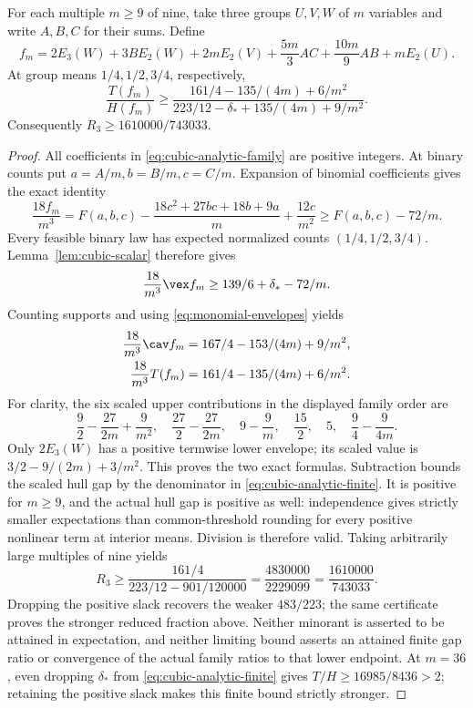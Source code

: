 \begin{theorem}\label{thm:cubic-analytic}
For each multiple $m\ge9$ of nine, take three groups $U,V,W$ of $m$
variables and write $A,B,C$ for their sums. Define
\begin{equation}\label{eq:cubic-analytic-family}
 f_m=2E_3(W)+3B E_2(W)+2mE_2(V)
       +\frac{5m}{3}AC+\frac{10m}{9}AB+mE_2(U).
\end{equation}
At group means $1/4,1/2,3/4$, respectively,
\begin{equation}\label{eq:cubic-analytic-finite}
 \frac{T(f_m)}{H(f_m)}\ge
 \frac{161/4-135/(4m)+6/m^2}
 {223/12-\delta_*+135/(4m)+9/m^2}.
\end{equation}
Consequently $R_3\ge1610000/743033$.
\end{theorem}
\begin{proof}
All coefficients in \eqref{eq:cubic-analytic-family} are positive integers.
At binary counts put $a=A/m,b=B/m,c=C/m$. Expansion of binomial
coefficients gives the exact identity
\begin{equation}\label{eq:cubic-count-expansion}
 \frac{18f_m}{m^3}=F(a,b,c)
 -\frac{18c^2+27bc+18b+9a}{m}+\frac{12c}{m^2}
 \ge F(a,b,c)-72/m.
\end{equation}
Every feasible binary law has expected normalized counts
$(1/4,1/2,3/4)$. Lemma~\ref{lem:cubic-scalar} therefore gives
\[
 \frac{18}{m^3}\vex f_m\ge139/6+\delta_*-72/m.
\]
Counting supports and using \eqref{eq:monomial-envelopes} yields
\begin{align}
 \frac{18}{m^3}\cav f_m&=167/4-153/(4m)+9/m^2,
       \label{eq:cubic-analytic-cav}\\
 \frac{18}{m^3}T(f_m)&=161/4-135/(4m)+6/m^2.
       \label{eq:cubic-analytic-tgap}
\end{align}
For clarity, the six scaled upper contributions in the displayed family
order are
\[
 \frac92-\frac{27}{2m}+\frac9{m^2},\quad
 \frac{27}2-\frac{27}{2m},\quad
 9-\frac9m,\quad\frac{15}2,\quad5,\quad
 \frac94-\frac9{4m}.
\]
Only $2E_3(W)$ has a positive termwise lower envelope; its scaled value
is $3/2-9/(2m)+3/m^2$. This proves the two exact formulas. Subtraction
bounds the scaled hull gap by the denominator in
\eqref{eq:cubic-analytic-finite}. It is positive for $m\ge9$, and the
actual hull gap is positive as well: independence gives strictly smaller
expectations than common-threshold rounding for every positive nonlinear
term at interior means. Division is therefore valid. Taking arbitrarily
large multiples of nine yields
\[
 R_3\ge\frac{161/4}{223/12-901/120000}
       =\frac{4830000}{2229099}=\frac{1610000}{743033}.
\]
Dropping the positive slack recovers the weaker $483/223$; the same
certificate proves the stronger reduced fraction above. Neither minorant
is asserted to be attained in expectation, and neither limiting bound
asserts an attained finite gap ratio or convergence of the actual family
ratios to that lower endpoint.
At $m=36$, even dropping $\delta_*$ from
\eqref{eq:cubic-analytic-finite} gives $T/H\ge16985/8436>2$;
retaining the positive slack makes this finite bound strictly stronger.
\end{proof}

